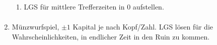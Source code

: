 \documentclass[a4paper,11pt,notitlepage,fullpage]{article}
\begin{document}
\begin{enumerate}
\begin{enumerate}
\item LGS für mittlere Trefferzeiten in $0$ aufstellen.
\begin{align*}
\end{align*}
\end{enumerate}

\item Münzwurfspiel, $\pm 1$ Kapital je nach Kopf/Zahl. LGS lösen für die Wahrscheinlichkeiten, in endlicher Zeit in den Ruin zu kommen.


\end{enumerate}
\end{document}
